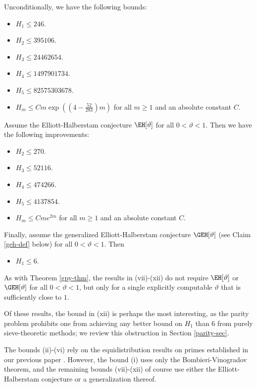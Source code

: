\begin{theorem}\label{main} Unconditionally, we have the following bounds:
\begin{itemize}
\item[(i)] $H_1 \leq 246$.   
\item[(ii)] $H_2 \leq \num{395106}$. 
\item[(iii)] $H_3 \leq \num{24462654}$. 
\item[(iv)] $H_4 \leq \num{1497901734}$.  
\item[(v)] $H_5 \leq \num{82575303678}$. 
\item[(vi)] $H_m \leq C m \exp( (4 - \frac{52}{283}) m )$ for all $m \geq 1$ and an absolute constant $C$.
\end{itemize}
Assume the Elliott-Halberstam conjecture $\EH[\vartheta]$ for all $0 < \vartheta < 1$.  Then we have the following improvements:
\begin{itemize}
\item[(vii)] $H_2 \leq 270$.
\item[(viii)] $H_3 \leq \num{52116}$.
\item[(ix)] $H_4 \leq \num{474266}$.
\item[(x)] $H_5 \leq \num{4137854}$.
\item[(xi)] $H_m \leq Cme^{2m}$ for all $m \geq 1$ and an absolute constant $C$.
\end{itemize}
Finally, assume the generalized Elliott-Halberstam conjecture $\GEH[\vartheta]$ (see Claim \ref{geh-def} below) for all $0 < \vartheta < 1$.  Then
\begin{itemize}
\item[(xii)] $H_1 \leq 6$.
\end{itemize}
\end{theorem}

As with Theorem \ref{gpy-thm}, the results in (vii)-(xii) do not require $\EH[\vartheta]$ or $\GEH[\vartheta]$ for all $0 < \vartheta < 1$, but only for a single explicitly computable $\vartheta$ that is sufficiently close to $1$.

Of these results, the bound in (xii) is perhaps the most interesting, as the parity problem \cite{selberg} prohibits one from achieving any better bound on $H_1$ than $6$ from purely sieve-theoretic methods; we review this obstruction in Section \ref{parity-sec}.

The bounds (ii)-(vi) rely on the equidistribution results on primes established in our previous paper \cite{polymath8a}.  However, the bound (i) uses only the Bombieri-Vinogradov theorem, and the remaining bounds (vii)-(xii) of course use either the Elliott-Halberstam conjecture or a generalization thereof.

